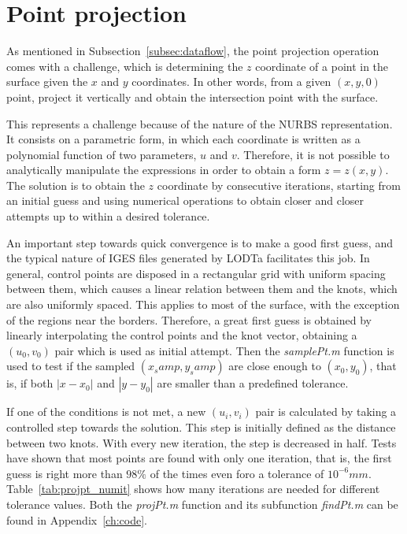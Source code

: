 	\section{Point projection}
	
	As mentioned in Subsection~\ref{subsec:dataflow}, the point projection operation comes with a challenge, which is determining the $z$ coordinate of a point in the surface given the $x$ and $y$ coordinates. In other words, from a given $(x,y,0)$ point, project it vertically and obtain the intersection point with the surface.
	
	This represents a challenge because of the nature of the NURBS representation. It consists on a parametric form, in which each coordinate is written as a polynomial function of two parameters, $u$ and $v$. Therefore, it is not possible to analytically manipulate the expressions in order to obtain a form $z = z(x,y)$. The solution is to obtain the $z$ coordinate by consecutive iterations, starting from an initial guess and using numerical operations to obtain closer and closer attempts up to within a desired tolerance.
	
	An important step towards quick convergence is to make a good first guess, and the typical nature of IGES files generated by LODTa facilitates this job. In general, control points are disposed in a rectangular grid with uniform spacing between them, which causes a linear relation between them and the knots, which are also uniformly spaced. This applies to most of the surface, with the exception of the regions near the borders. Therefore, a great first guess is obtained by linearly interpolating the control points and the knot vector, obtaining a $(u_0,v_0)$ pair which is used as initial attempt. Then the \textit{samplePt.m} function is used to test if the sampled $(x_samp,y_samp)$ are close enough to $(x_0,y_0)$, that is, if both $|x-x_0|$ and $|y-y_0|$ are smaller than a predefined tolerance.
	
	If one of the conditions is not met, a new $(u_i,v_i)$ pair is calculated by taking a controlled step towards the solution. This step is initially defined as the distance between two knots. With every new iteration, the step is decreased in half. Tests have shown that most points are found with only one iteration, that is, the first guess is right more than $98\%$ of the times even foro a tolerance of $10^{-6} mm$. Table~\ref{tab:projpt_numit} shows how many iterations are needed for different tolerance values. Both the \textit{projPt.m} function and its subfunction \textit{findPt.m} can be found in Appendix~\ref{ch:code}.
	
